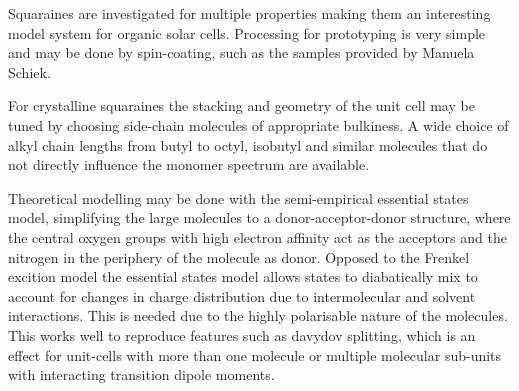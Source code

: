\documentclass[twoside,openright]{scrreprt}
\begin{document}
Squaraines are investigated for multiple properties making them an interesting model system for organic solar cells. Processing for prototyping is very simple and may be done by spin-coating, such as the samples provided by Manuela Schiek.

For crystalline squaraines the stacking and geometry of the unit cell may be tuned by choosing side-chain molecules of appropriate bulkiness. A wide choice of alkyl chain lengths from butyl to octyl, isobutyl and similar molecules that do not directly influence the monomer spectrum are available. \cite{Hestand2015, Brueck2014, Balzer2022} 

Theoretical modelling may be done with the semi-empirical essential states model, simplifying the large molecules to a donor-acceptor-donor structure, where the central oxygen groups with high electron affinity act as the acceptors and the nitrogen in the periphery of the molecule as donor. Opposed to the Frenkel excition model the essential states model allows states to diabatically mix to account for changes in charge distribution due to intermolecular and solvent interactions. This is needed due to the highly polarisable nature of the molecules. This works well to reproduce features such as davydov splitting, which is an effect for unit-cells with more than one molecule or multiple molecular sub-units with interacting transition dipole moments.\cite{Zhong2019, Hestand2015} 
\end{document}
